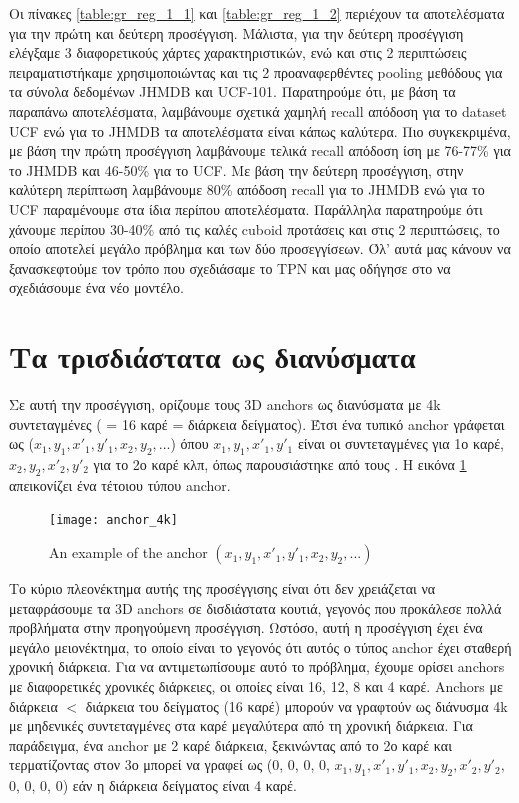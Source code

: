 \gr
Οι πίνακες \ref{table:gr_reg_1_1} και \ref{table:gr_reg_1_2} περιέχουν τα αποτελέσματα για την πρώτη και δεύτερη προσέγγιση. Μάλιστα, για την δεύτερη προσέγγιση ελέγξαμε 3 διαφορετικούς χάρτες
χαρακτηριστικών, ενώ και στις 2 περιπτώσεις πειραματιστήκαμε χρησιμοποιώντας και τις 2 προαναφερθέντες \en pooling \gr μεθόδους για τα σύνολα δεδομένων \en JHMDB \gr και \en UCF-101\gr.
Παρατηρούμε ότι, με βάση τα παραπάνω αποτελέσματα, λαμβάνουμε σχετικά χαμηλή \en recall \gr απόδοση για το \en dataset UCF \gr ενώ για το \en JHMDB \gr  τα αποτελέσματα είναι κάπως καλύτερα.
Πιο συγκεκριμένα, με βάση την πρώτη προσέγγιση λαμβάνουμε τελικά \en recall \gr απόδοση ίση με 76-77\% για το \en JHMDB \gr και 46-50\% για το \en UCF\gr. Με βάση την δεύτερη προσέγγιση,
στην καλύτερη περίπτωση λαμβάνουμε 80\% απόδοση \en recall  \gr για το \en JHMDB \gr ενώ για το \en UCF \gr παραμένουμε στα ίδια περίπου αποτελέσματα.
Παράλληλα παρατηρούμε ότι χάνουμε περίπου 30-40\% από τις καλές \en cuboid \gr προτάσεις και στις 2 περιπτώσεις, το οποίο αποτελεί μεγάλο πρόβλημα και των δύο προσεγγίσεων.
Όλ' αυτά μας κάνουν να ξανασκεφτούμε τον τρόπο που σχεδιάσαμε το \en TPN \gr και μας οδήγησε στο να σχεδιάσουμε ένα νέο μοντέλο.


\section{Τα τρισδιάστατα  ως  διανύσματα}
Σε αυτή την προσέγγιση, ορίζουμε τους \en 3D anchors \gr ως διανύσματα με \en 4k \gr συντεταγμένες ( = 16 καρέ = διάρκεια δείγματος).
Έτσι ένα τυπικό \en anchor \gr γράφεται ως ($x_1, y_1, x'_1, y'_1, x_2, y_2, ...$)
όπου $x_1, y_1, x'_1, y'_1 $ είναι οι συντεταγμένες για 1ο καρέ, $x_2, y_2, x'_2, y'_2$ για το 2ο καρέ κλπ, όπως παρουσιάστηκε από τους \en\cite{DBLP:journals/corr/abs-1712-09184}\gr. 
Η εικόνα \ref{fig:gr_anchor_4k} απεικονίζει ένα τέτοιου τύπου \en anchor\gr.

\en
\begin{figure}[h]
  \centering
  \texttt{[image: anchor\_4k]}
  \caption{An example of the anchor $(x_1,y_1,x'_1,y'_1,x_2,y_2, ...)$}
  \label{fig:gr_anchor_4k}
\end{figure}
\gr

Το κύριο πλεονέκτημα αυτής της προσέγγισης είναι ότι δεν χρειάζεται να μεταφράσουμε τα \en 3D anchors \gr σε δισδιάστατα κουτιά, γεγονός που προκάλεσε πολλά προβλήματα στην προηγούμενη προσέγγιση.
Ωστόσο, αυτή η προσέγγιση έχει ένα μεγάλο μειονέκτημα, το οποίο είναι το γεγονός ότι αυτός ο τύπος \en anchor \gr έχει σταθερή χρονική διάρκεια.
Για να αντιμετωπίσουμε αυτό το πρόβλημα, έχουμε ορίσει \en anchors \gr με διαφορετικές χρονικές διάρκειες, οι οποίες είναι 16, 12, 8 και 4 καρέ.
\en Anchors \gr με διάρκεια $<$  διάρκεια του δείγματος (16 καρέ) μπορούν  να γραφτούν ως διάνυσμα \en 4k \gr με μηδενικές συντεταγμένες στα καρέ μεγαλύτερα από τη χρονική διάρκεια.
Για παράδειγμα, ένα \en anchor \gr με 2 καρέ διάρκεια, ξεκινώντας από το 2ο καρέ και τερματίζοντας στον 3ο μπορεί να γραφεί ως
(0, 0, 0, 0, $x_1, y_1, x'_1, y'_1, x_2, y_2, x'_2, y'_2$, 0, 0, 0, 0)  εάν η διάρκεια δείγματος
είναι 4 καρέ. 


